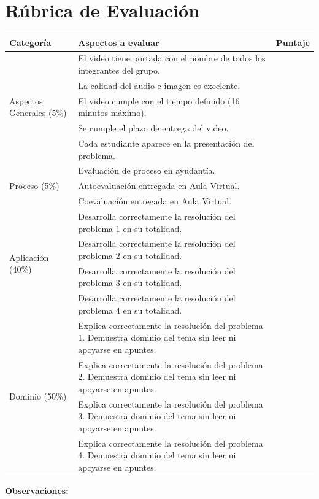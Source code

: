 \documentclass[12pt]{article}
\begin{document}
	\section*{Rúbrica de Evaluación}
	
	\renewcommand{\arraystretch}{1.5}
	
	\begin{tabular}{|m{3cm}|m{10cm}|m{2cm}|}
		\hline
		\textbf{Categoría} & \textbf{Aspectos a evaluar} & \textbf{Puntaje} \\
		\hline
		
		\multirow{5}{*}{Aspectos Generales (5\%)} 
		& El video tiene portada con el nombre de todos los integrantes del grupo. & \\
		\cline{2-3}
		& La calidad del audio e imagen es excelente. & \\
		\cline{2-3}
		& El video cumple con el tiempo definido (16 minutos máximo). & \\
		\cline{2-3}
		& Se cumple el plazo de entrega del video. & \\
		\cline{2-3}
		& Cada estudiante aparece en la presentación del problema. & \\
		\hline
		
		\multirow{3}{*}{Proceso (5\%)} 
		& Evaluación de proceso en ayudantía. & \\
		\cline{2-3}
		& Autoevaluación entregada en Aula Virtual. & \\
		\cline{2-3}
		& Coevaluación entregada en Aula Virtual. & \\
		\hline
		
		\multirow{4}{*}{Aplicación (40\%)} 
		& Desarrolla correctamente la resolución del problema 1 en su totalidad. & \\
		\cline{2-3}
		& Desarrolla correctamente la resolución del problema 2 en su totalidad. & \\
		\cline{2-3}
		& Desarrolla correctamente la resolución del problema 3 en su totalidad. & \\
		\cline{2-3}
		& Desarrolla correctamente la resolución del problema 4 en su totalidad. & \\
		\hline
		
		\multirow{4}{*}{Dominio (50\%)} 
		& Explica correctamente la resolución del problema 1. Demuestra dominio del tema sin leer ni apoyarse en apuntes. & \\
		\cline{2-3}
		& Explica correctamente la resolución del problema 2. Demuestra dominio del tema sin leer ni apoyarse en apuntes. & \\
		\cline{2-3}
		& Explica correctamente la resolución del problema 3. Demuestra dominio del tema sin leer ni apoyarse en apuntes. & \\
		\cline{2-3}
		& Explica correctamente la resolución del problema 4. Demuestra dominio del tema sin leer ni apoyarse en apuntes. & \\
		\hline
		
	\end{tabular}
	
	\vspace{0.8cm}
	
	\textbf{Observaciones:}
	
	\vspace{2cm}
	
	\hrulefill
	
\end{document}
